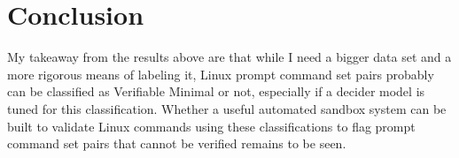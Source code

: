\documentclass[12pt,a4paper]{article}
\begin{document}
\section{Conclusion}

My takeaway from the results above are that while I need a bigger data set and a more rigorous means of labeling it, Linux prompt command set pairs probably can be classified as Verifiable Minimal or not, especially
if a decider model is tuned for this classification. Whether a useful automated sandbox system can be built to validate Linux commands using these classifications to flag prompt
command set pairs that cannot be verified remains to be seen.
\end{document}

